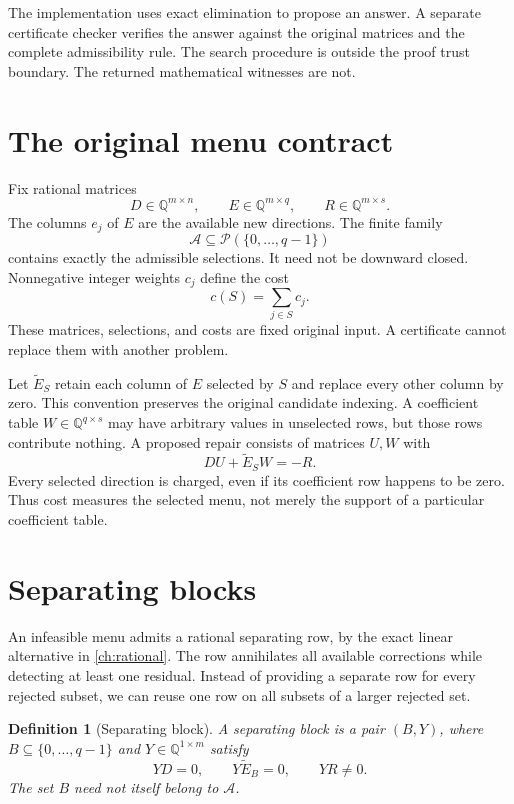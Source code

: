 \documentclass[11pt,letterpaper,oneside,openany]{book}
\theoremstyle{quiet}
\newtheorem{definition}[theorem]{Definition}
\newcommand{\Q}{\mathbb{Q}}
\begin{document}
The implementation uses exact elimination to propose an answer. A separate certificate checker verifies the answer against the original matrices and the complete admissibility rule. The search procedure is outside the proof trust boundary. The returned mathematical witnesses are not.

\section{The original menu contract}

Fix rational matrices
\[
 D\in\Q^{m\times n},\qquad E\in\Q^{m\times q},\qquad R\in\Q^{m\times s}.
\]
The columns $e_j$ of $E$ are the available new directions. The finite family
\[
 \mathcal A\subseteq\mathcal P(\{0,\ldots,q-1\})
\]
contains exactly the admissible selections. It need not be downward closed. Nonnegative integer weights $c_j$ define the cost
\[
 c(S)=\sum_{j\in S}c_j.
\]
These matrices, selections, and costs are fixed original input. A certificate cannot replace them with another problem.

Let $\widetilde E_S$ retain each column of $E$ selected by $S$ and replace every other column by zero. This convention preserves the original candidate indexing. A coefficient table $W\in\Q^{q\times s}$ may have arbitrary values in unselected rows, but those rows contribute nothing. A proposed repair consists of matrices $U,W$ with
\begin{equation}
 DU+\widetilde E_SW=-R.
 \label{eq:menu-cover-primal}
\end{equation}
Every selected direction is charged, even if its coefficient row happens to be zero. Thus cost measures the selected menu, not merely the support of a particular coefficient table.

\section{Separating blocks}

An infeasible menu admits a rational separating row, by the exact linear alternative in \cref{ch:rational}. The row annihilates all available corrections while detecting at least one residual. Instead of providing a separate row for every rejected subset, we can reuse one row on all subsets of a larger rejected set.

\begin{definition}[Separating block]
A separating block is a pair $(B,Y)$, where $B\subseteq\{0,\ldots,q-1\}$ and $Y\in\Q^{1\times m}$ satisfy
\begin{equation}
 YD=0,\qquad Y\widetilde E_B=0,\qquad YR\ne0.
 \label{eq:menu-cover-dual}
\end{equation}
The set $B$ need not itself belong to $\mathcal A$.
\end{definition}
\end{document}
